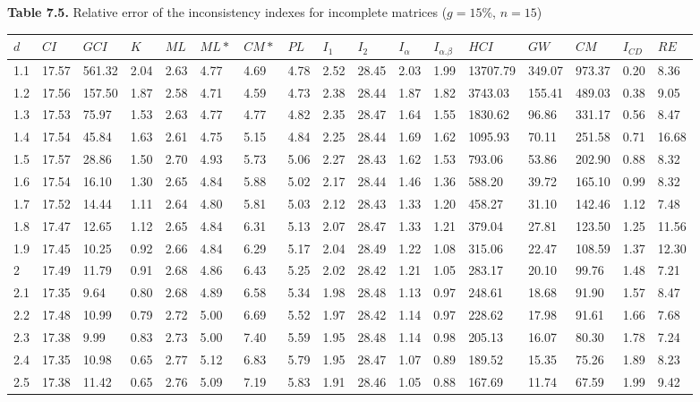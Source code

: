 \newpage\textbf{Table 7.5.} Relative error of the inconsistency indexes for incomplete matrices ($g=15\%$, $n=15$)
\begin{adjustbox}{angle=90}
  \begin{center}
    \begin{tabular}{|l|llllllllllllllll|}
      \hline $d$ &
$CI$&$	\textit{GCI}$&$K$&$ML$&$ML*$&$CM*$&$PL$&$I_1$&$I_2$&$I_{\alpha}$&$I_{\alpha.\beta}$&$HCI$&$GW$&$CM$&$I_{CD}$&$RE$\\ \hline \hline
1.1&17.57&561.32&2.04&2.63&4.77&4.69&4.78&2.52&28.45&2.03&1.99&13707.79&349.07&973.37&0.20&8.36  \\ 
1.2&17.56&157.50&1.87&2.58&4.71&4.59&4.73&2.38&28.44&1.87&1.82&3743.03&155.41&489.03&0.38&9.05  \\ 
1.3&17.53&75.97&1.53&2.63&4.77&4.77&4.82&2.35&28.47&1.64&1.55&1830.62&96.86&331.17&0.56&8.47  \\ 
1.4&17.54&45.84&1.63&2.61&4.75&5.15&4.84&2.25&28.44&1.69&1.62&1095.93&70.11&251.58&0.71&16.68  \\ 
1.5&17.57&28.86&1.50&2.70&4.93&5.73&5.06&2.27&28.43&1.62&1.53&793.06&53.86&202.90&0.88&8.32  \\ 
1.6&17.54&16.10&1.30&2.65&4.84&5.88&5.02&2.17&28.44&1.46&1.36&588.20&39.72&165.10&0.99&8.32  \\ 
1.7&17.52&14.44&1.11&2.64&4.80&5.81&5.03&2.12&28.43&1.33&1.20&458.27&31.10&142.46&1.12&7.48  \\ 
1.8&17.47&12.65&1.12&2.65&4.84&6.31&5.13&2.07&28.47&1.33&1.21&379.04&27.81&123.50&1.25&11.56  \\ 
1.9&17.45&10.25&0.92&2.66&4.84&6.29&5.17&2.04&28.49&1.22&1.08&315.06&22.47&108.59&1.37&12.30  \\ 
2&17.49&11.79&0.91&2.68&4.86&6.43&5.25&2.02&28.42&1.21&1.05&283.17&20.10&99.76&1.48&7.21  \\ 
2.1&17.35&9.64&0.80&2.68&4.89&6.58&5.34&1.98&28.48&1.13&0.97&248.61&18.68&91.90&1.57&8.47  \\ 
2.2&17.48&10.99&0.79&2.72&5.00&6.69&5.52&1.97&28.42&1.14&0.97&228.62&17.98&91.61&1.66&7.68  \\ 
2.3&17.38&9.99&0.83&2.73&5.00&7.40&5.59&1.95&28.48&1.14&0.98&205.13&16.07&80.30&1.78&7.24  \\ 
2.4&17.35&10.98&0.65&2.77&5.12&6.83&5.79&1.95&28.47&1.07&0.89&189.52&15.35&75.26&1.89&8.23  \\ 
2.5&17.38&11.42&0.65&2.76&5.09&7.19&5.83&1.91&28.46&1.05&0.88&167.69&11.74&67.59&1.99&9.42  \\ 

\end{tabular}
\end{center}
\end{adjustbox}
